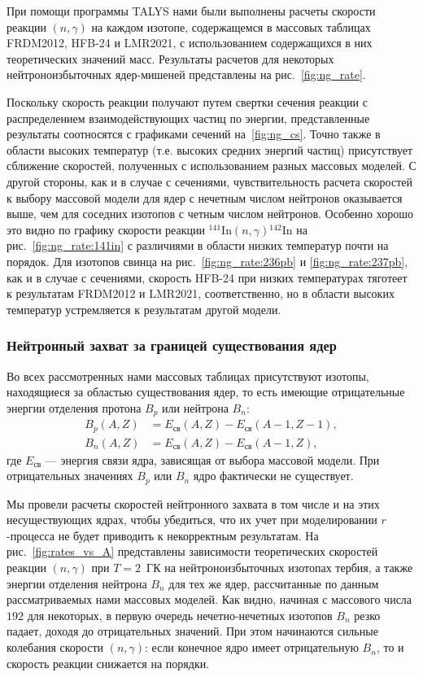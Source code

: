 При помощи программы TALYS нами были выполнены расчеты скорости реакции $(n,\gamma)$ на каждом изотопе, содержащемся в массовых таблицах FRDM2012, HFB-24 и LMR2021, с использованием содержащихся в них теоретических значений масс. Результаты расчетов для некоторых нейтроноизбыточных ядер-мишеней представлены на рис.~\ref{fig:ng_rate}. 

Поскольку скорость реакции получают путем свертки сечения реакции с распределением взаимодействующих частиц по энергии, представленные результаты соотносятся с графиками сечений на~\ref{fig:ng_cs}. Точно также в области высоких температур (т.е. высоких средних энергий частиц) присутствует сближение скоростей, полученных с использованием разных массовых моделей. С другой стороны, как и в случае с сечениями, чувствительность расчета скоростей к выбору массовой модели для ядер с нечетным числом нейтронов оказывается выше, чем для соседних изотопов с четным числом нейтронов. Особенно хорошо это видно по графику скорости реакции ${}^{141}\text{In}(n,\gamma){}^{142}\text{In}$ на рис.~\ref{fig:ng_rate:141in} с различиями в области низких температур почти на порядок. Для изотопов свинца на рис.~\ref{fig:ng_rate:236pb} и \ref{fig:ng_rate:237pb}, как и в случае с сечениями, скорость HFB-24 при низких температурах тяготеет к результатам FRDM2012 и LMR2021, соответственно, но в области высоких температур устремляется к результатам другой модели.

\subsubsection{Нейтронный захват за границей существования ядер}
Во всех рассмотренных нами массовых таблицах присутствуют изотопы, находящиеся за областью существования ядер, то есть имеющие отрицательные энергии отделения протона $B_p$ или нейтрона $B_n$:
\begin{equation}\begin{aligned}\label{eq:driplines}
B_p(A,Z) &= E_{\text{св}}(A,Z) - E_{\text{св}}(A-1,Z-1),\\
B_n(A,Z) &= E_{\text{св}}(A,Z) - E_{\text{св}}(A-1,Z),
\end{aligned}\end{equation}
где $E_{\text{св}}$ --- энергия связи ядра, зависящая от выбора массовой модели. При отрицательных значениях $B_p$ или $B_n$ ядро фактически не существует. 

Мы провели расчеты скоростей нейтронного захвата в том числе и на этих несуществующих ядрах, чтобы убедиться, что их учет при моделировании $r$-процесса не будет приводить к некорректным результатам. На рис.~\ref{fig:rates_vs_A} представлены зависимости теоретических скоростей реакции $(n,\gamma)$ при $T = 2$~ГК на нейтроноизбыточных изотопах тербия, а также энергии отделения нейтрона $B_n$ для тех же ядер, рассчитанные по данным рассматриваемых нами массовых моделей. Как видно, начиная с массового числа $192$ для некоторых, в первую очередь нечетно-нечетных изотопов $B_n$ резко падает, доходя до отрицательных значений. При этом начинаются сильные колебания скорости $(n,\gamma)$: если конечное ядро имеет отрицательную $B_n$, то и скорость реакции снижается на порядки. 

